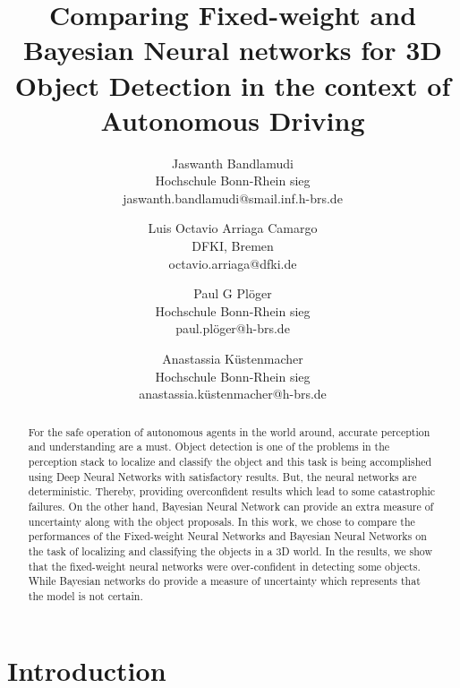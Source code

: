 \documentclass[10pt,twocolumn,letterpaper]{article}
\begin{document}
\title{Comparing Fixed-weight and Bayesian Neural networks for 3D Object Detection in the context of Autonomous Driving}

\author{
Jaswanth Bandlamudi\\
{Hochschule Bonn-Rhein sieg\\
 jaswanth.bandlamudi@smail.inf.h-brs.de}
\and 
Luis Octavio Arriaga Camargo\\
{DFKI, Bremen\\
 octavio.arriaga@dfki.de}
\and
Paul G Pl\"{o}ger\\
{Hochschule Bonn-Rhein sieg\\
 paul.pl\"{o}ger@h-brs.de}
\and
Anastassia K\"{u}stenmacher\\
{Hochschule Bonn-Rhein sieg\\
 anastassia.k\"{u}stenmacher@h-brs.de}

}

\maketitle

\begin{abstract}
   For the safe operation of autonomous agents in the world around, accurate perception and understanding are a must. Object detection is one of the problems in the perception stack to localize and classify the object and this task is being accomplished using Deep Neural Networks with satisfactory results. But, the neural networks are deterministic. Thereby, providing overconfident results which lead to some catastrophic failures. On the other hand, Bayesian Neural Network can provide an extra measure of uncertainty along with the object proposals. In this work, we chose to compare the performances of the Fixed-weight Neural Networks and Bayesian Neural Networks on the task of localizing and classifying the objects in a 3D world. In the results, we show that the fixed-weight neural networks were over-confident in detecting some objects. While Bayesian networks do provide a measure of uncertainty which represents that the model is not certain. 
\end{abstract}

\section{Introduction}
\end{document}
